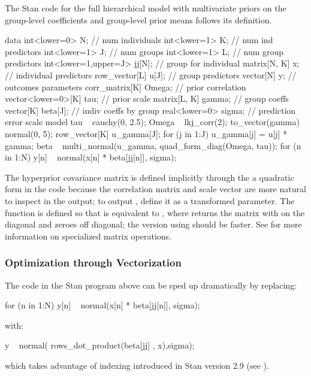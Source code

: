 The Stan code for the full hierarchical model with multivariate priors
on the group-level coefficients and group-level prior means follows
its definition.
%
\begin{stancode}
data {
  int<lower=0> N;              // num individuals
  int<lower=1> K;              // num ind predictors
  int<lower=1> J;              // num groups
  int<lower=1> L;              // num group predictors
  int<lower=1,upper=J> jj[N];  // group for individual
  matrix[N, K] x;               // individual predictors
  row_vector[L] u[J];          // group predictors
  vector[N] y;                 // outcomes
}
parameters {
  corr_matrix[K] Omega;        // prior correlation
  vector<lower=0>[K] tau;      // prior scale
  matrix[L, K] gamma;           // group coeffs
  vector[K] beta[J];           // indiv coeffs by group
  real<lower=0> sigma;         // prediction error scale
}
model {
  tau ~ cauchy(0, 2.5);
  Omega ~ lkj_corr(2);
  to_vector(gamma) ~ normal(0, 5);
  {
    row_vector[K] u_gamma[J];
    for (j in 1:J)
      u_gamma[j] = u[j] * gamma;
    beta ~ multi_normal(u_gamma, quad_form_diag(Omega, tau));
  }
  for (n in 1:N)
    y[n] ~ normal(x[n] * beta[jj[n]], sigma);
}
\end{stancode}
%
The hyperprior covariance matrix is defined implicitly through the
a quadratic form in the code 
because the correlation matrix  and scale vector
 are more natural to inspect in the output; to output
, define it as a transformed parameter.  The function
 is defined so that
 is equivalent to
, where
 returns the matrix with  on the
diagonal and zeroes off diagonal; the version using
 should be faster.  See
 for more information on
specialized matrix operations.

\subsubsection{Optimization through Vectorization}

The code in the Stan program above can be sped up dramatically by replacing:
%
\begin{stancode}
  for (n in 1:N)
    y[n] ~ normal(x[n] * beta[jj[n]], sigma);
\end{stancode}
%
with:
%
\begin{stancode}
  y ~ normal( rows_dot_product(beta[jj] , x),sigma);
\end{stancode}
%
which takes advantage of indexing introduced in Stan version 2.9 (see ).

